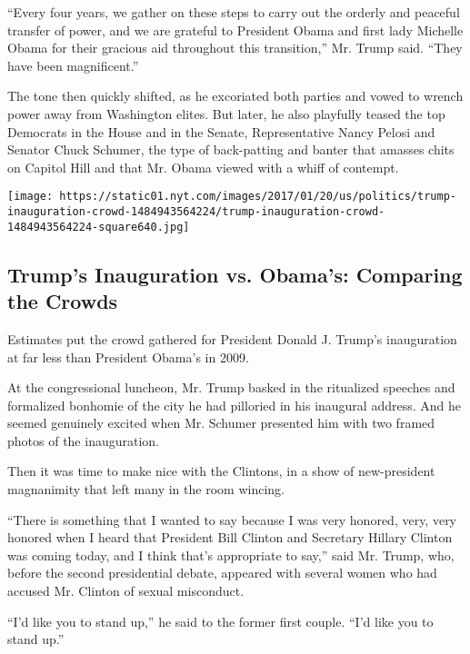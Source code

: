 ``Every four years, we gather on these steps to carry out the orderly
and peaceful transfer of power, and we are grateful to President Obama
and first lady Michelle Obama for their gracious aid throughout this
transition,'' Mr. Trump said. ``They have been magnificent.''

The tone then quickly shifted, as he excoriated both parties and vowed
to wrench power away from Washington elites. But later, he also
playfully teased the top Democrats in the House and in the Senate,
Representative Nancy Pelosi and Senator Chuck Schumer, the type of
back-patting and banter that amasses chits on Capitol Hill and that Mr.
Obama viewed with a whiff of contempt.

\href{https://www.nytimes.com/interactive/2017/01/20/us/politics/trump-inauguration-crowd.html}{}

\texttt{[image: https://static01.nyt.com/images/2017/01/20/us/politics/trump-inauguration-crowd-1484943564224/trump-inauguration-crowd-1484943564224-square640.jpg]}

\hypertarget{trumps-inauguration-vs-obamas-comparing-the-crowds}{%
\subsection{Trump's Inauguration vs. Obama's: Comparing the
Crowds}\label{trumps-inauguration-vs-obamas-comparing-the-crowds}}

Estimates put the crowd gathered for President Donald J. Trump's
inauguration at far less than President Obama's in 2009.

At the congressional luncheon, Mr. Trump basked in the ritualized
speeches and formalized bonhomie of the city he had pilloried in his
inaugural address. And he seemed genuinely excited when Mr. Schumer
presented him with two framed photos of the inauguration.

Then it was time to make nice with the Clintons, in a show of
new-president magnanimity that left many in the room wincing.

``There is something that I wanted to say because I was very honored,
very, very honored when I heard that President Bill Clinton and
Secretary Hillary Clinton was coming today, and I think that's
appropriate to say,'' said Mr. Trump, who, before the second
presidential debate, appeared with several women who had accused Mr.
Clinton of sexual misconduct.

``I'd like you to stand up,'' he said to the former first couple. ``I'd
like you to stand up.''

